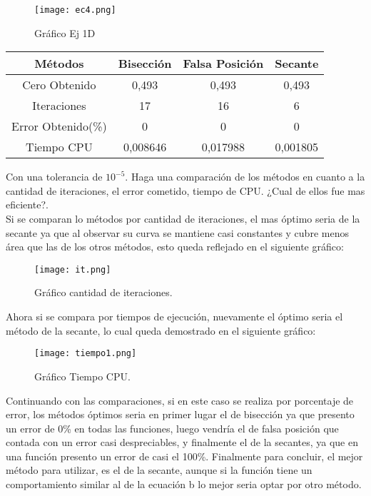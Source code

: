 \documentclass{udpreport}
\begin{document}
\begin{enumerate}
\begin{enumerate}
        \begin{figure}[H]
        \centering
        \texttt{[image: ec4.png]}
        \caption{Gráfico Ej 1D}
        \end{figure}
        \begin{table}[H]
        \centering
           \begin{tabular} { |c|c|c|c|}
                \hline
                Métodos       & Bisección & Falsa Posición & Secante  \\
                \hline
                Cero Obtenido &  0,493      &    0,493     &      0,493   \\
                \hline
                Iteraciones   &   17        &    16     &      6     \\
                \hline
                Error Obtenido(\%) &       0      &       0      &     0         \\
                \hline
                Tiempo CPU &      0,008646     &      0,017988    &     0,001805         \\
                 \hline
                \end{tabular}
            \end{table}
    Con una tolerancia de $10^{−5}$. Haga una comparación de los métodos en cuanto a la cantidad de iteraciones, el error cometido, tiempo de CPU. ¿Cual de ellos fue mas eﬁciente?.\\
    Si se comparan lo métodos por cantidad de iteraciones, el mas óptimo seria de la secante ya que al observar su curva se mantiene casi constantes y cubre menos área que las de los otros métodos, esto queda reflejado en el siguiente gráfico:
    \begin{figure}[H]
        \centering
        \texttt{[image: it.png]}
        \caption{Gráfico cantidad de iteraciones.}
        \end{figure}
    Ahora si se compara por tiempos de ejecución, nuevamente el óptimo seria el método de la secante, lo cual queda demostrado en el siguiente gráfico:
    \begin{figure}[H]
        \centering
        \texttt{[image: tiempo1.png]}
        \caption{Gráfico Tiempo CPU.}
        \end{figure}
    Continuando con las comparaciones, si en este caso se realiza por porcentaje de error, los métodos óptimos seria en primer lugar el de bisección ya que presento un error de 0\% en todas las funciones, luego vendría el de falsa posición que contada con un error casi despreciables, y finalmente el de la secantes, ya que en una función presento un error de casi el 100\%.
    Finalmente para concluir, el mejor método para utilizar, es el de la secante, aunque si la función tiene un comportamiento similar al de la ecuación b lo mejor seria optar por otro método.
      

\end{enumerate}
\end{enumerate}
\end{document}
